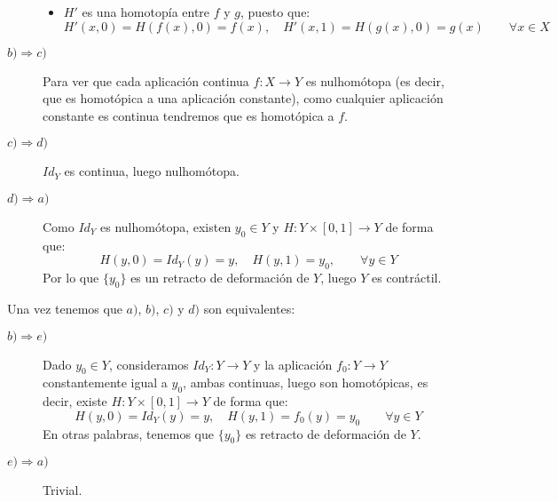 \begin{ejercicio}
\begin{description}
\begin{itemize}
                \item $H'$ es una homotopía entre $f$ y $g$, puesto que:
                    \begin{equation*}
                        H'(x,0) = H(f(x),0) = f(x), \quad H'(x,1) = H(g(x),0) = g(x) \qquad \forall x\in X
                    \end{equation*}
            \end{itemize}
        \item [$b)\Longrightarrow c)$] Para ver que cada aplicación continua $f:X\to Y$ es nulhomótopa (es decir, que es homotópica a una aplicación constante), como cualquier aplicación constante es continua tendremos que es homotópica a $f$.
        \item [$c)\Longrightarrow d)$] $Id_Y$ es continua, luego nulhomótopa.
        \item [$d)\Longrightarrow a)$] Como $Id_Y$ es nulhomótopa, existen $y_0 \in Y$ y $H:Y\times [0,1]\to Y$ de forma que:
            \begin{equation*}
                H(y,0) = Id_Y(y) = y, \quad H(y,1) = y_0, \qquad \forall y\in Y
            \end{equation*}
            Por lo que $\{y_0\}$ es un retracto de deformación de $Y$, luego $Y$ es contráctil.
    \end{description}
    Una vez tenemos que $a)$, $b)$, $c)$ y $d)$ son equivalentes:
    \begin{description}
        \item [$b)\Longrightarrow e)$] Dado $y_0\in Y$, consideramos $Id_Y:Y\to Y$ y la aplicación $f_0:Y\to Y$ constantemente igual a $y_0$, ambas continuas, luego son homotópicas, es decir, existe $H:Y\times [0,1]\to Y$ de forma que:
            \begin{equation*}
                H(y,0) = Id_Y(y) = y, \quad H(y,1) = f_0(y) = y_0 \qquad \forall y\in Y
            \end{equation*}
            En otras palabras, tenemos que $\{y_0\}$ es retracto de deformación de $Y$.
        \item [$e)\Longrightarrow a)$] Trivial.
    \end{description}
\end{ejercicio}

